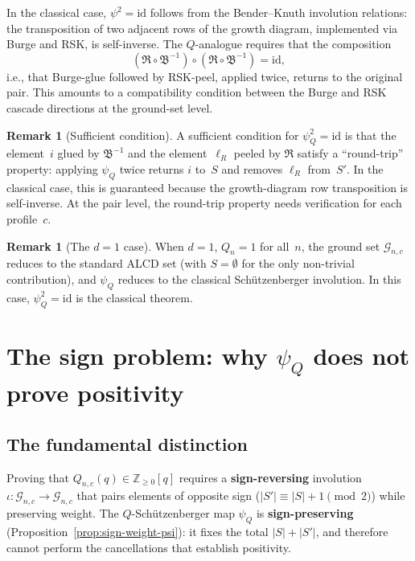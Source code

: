 \documentclass[11pt]{article}
\newcommand{\Z}{\mathbb{Z}}
\theoremstyle{plain}
\theoremstyle{definition}
\newtheorem{remark}[theorem]{Remark}
\begin{document}
In the classical case, $\psi^2 = \mathrm{id}$ follows from
the Bender--Knuth involution relations: the transposition of
two adjacent rows of the growth diagram, implemented via
Burge and RSK, is self-inverse.  The $Q$-analogue requires
that the composition
\[
  (\mathfrak{R} \circ \mathfrak{B}^{-1})
  \circ
  (\mathfrak{R} \circ \mathfrak{B}^{-1})
  = \mathrm{id},
\]
i.e., that Burge-glue followed by RSK-peel, applied twice,
returns to the original pair.  This amounts to a compatibility
condition between the Burge and RSK cascade directions at the
ground-set level.

\begin{remark}[Sufficient condition]
\label{rem:sufficient}
A sufficient condition for $\psi_Q^2 = \mathrm{id}$ is that
the element~$i$ glued by $\mathfrak{B}^{-1}$ and the
element~$\ell_R$ peeled by $\mathfrak{R}$ satisfy a
``round-trip'' property: applying $\psi_Q$ twice returns
$i$ to~$S$ and removes $\ell_R$ from~$S'$.  In the classical
case, this is guaranteed because the growth-diagram row
transposition is self-inverse.  At the pair level, the
round-trip property needs verification for each profile~$c$.
\end{remark}

\begin{remark}[The $d = 1$ case]
\label{rem:d1}
When $d = 1$, $Q_n = 1$ for all~$n$, the ground set
$\mathcal{G}_{n,c}$ reduces to the standard ALCD set (with
$S = \emptyset$ for the only non-trivial contribution), and
$\psi_Q$ reduces to the classical Sch\"utzenberger involution.
In this case, $\psi_Q^2 = \mathrm{id}$ is the classical
theorem.
\end{remark}


\section{The sign problem: why $\psi_Q$ does not prove positivity}
\label{sec:sign-problem}

\subsection{The fundamental distinction}

Proving that $Q_{n,c}(q) \in \Z_{\geq 0}[q]$ requires a
\textbf{sign-reversing} involution
$\iota\colon \mathcal{G}_{n,c} \to \mathcal{G}_{n,c}$ that pairs
elements of opposite sign
($|S'| \equiv |S| + 1 \pmod{2}$) while preserving weight.  The
$Q$-Sch\"utzenberger map $\psi_Q$ is \textbf{sign-preserving}
(Proposition~\ref{prop:sign-weight-psi}): it fixes the total
$|S| + |S'|$, and therefore cannot perform the cancellations
that establish positivity.
\end{document}
